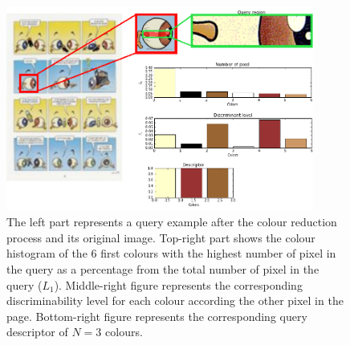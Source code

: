 




 \begin{figure}[!ht]	%
 	 \centering
 	\includegraphics[width=0.9\textwidth]{description_sequence.png}
 	\caption[Comic character query description]{The left part represents a query example after the colour reduction process and its original image. Top-right part shows the colour histogram of the 6 first colours with the highest number of pixel in the query as a percentage from the total number of pixel in the query ($L_1$). Middle-right figure represents the corresponding discriminability level for each colour according the other pixel in the page. Bottom-right figure represents the corresponding query descriptor of $N=3$ colours.}
 	\label{fig:in:dominant_colour_hist_desc}
 \end{figure}



